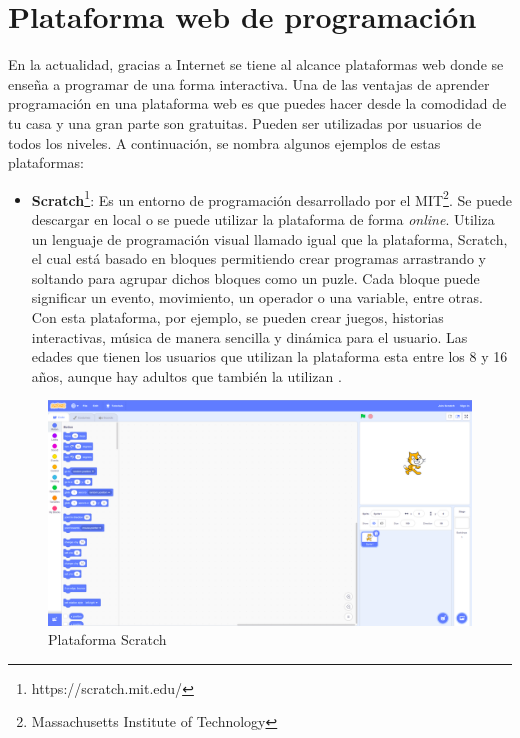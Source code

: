 \section{Plataforma web de programación}
En la actualidad, gracias a Internet se tiene al alcance plataformas web donde se enseña a programar de una forma interactiva. Una de las ventajas de aprender programación en una plataforma web es que puedes hacer desde la comodidad de tu casa y una gran parte son gratuitas. Pueden ser utilizadas por usuarios de todos los niveles. A continuación, se nombra algunos ejemplos de estas plataformas:\\
\newpage
\begin{itemize}
\item \textbf{Scratch}\footnote{https://scratch.mit.edu/}: Es un entorno de programación desarrollado por el MIT\footnote{Massachusetts Institute of Technology}. Se puede descargar en local o se puede utilizar la plataforma de forma \textit{online}. Utiliza un lenguaje de programación visual llamado igual que la plataforma, Scratch, el cual está basado en bloques permitiendo crear programas arrastrando y soltando para agrupar dichos bloques como un puzle. Cada bloque puede significar un evento, movimiento, un operador o una variable, entre otras. Con esta plataforma, por ejemplo, se pueden crear juegos, historias interactivas, música de manera sencilla y dinámica para el usuario. Las edades que tienen los usuarios que utilizan la plataforma esta entre los 8 y 16 años, aunque hay adultos que también la utilizan \cite{scratch}.
\end{itemize}

\begin{figure}[H]
    \centering
    \includegraphics[width=12cm, keepaspectratio]{img/scratch.png}
    \caption{Plataforma Scratch}
    \label{fig:scrach}
\end{figure}

